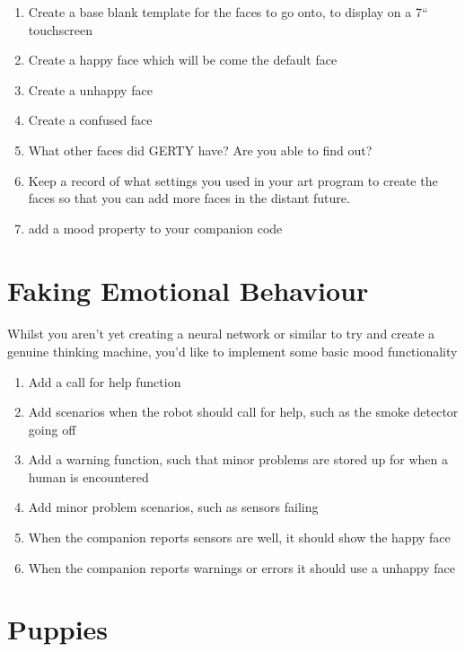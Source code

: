 \documentclass[11pt]{book}
\begin{document}
\begin{enumerate}
\item Create a base blank template for the faces to go onto, to display on a 7`` touchscreen
\item Create a happy face which will be come the default face
\item Create a unhappy face
\item Create a confused face
\item What other faces did GERTY have? Are you able to find out?
\item Keep a record of what settings you used in your art program to create the faces so that you can add more faces in the distant future.
\item add a mood property to your companion code
\end{enumerate}

\clearpage

\section{Faking Emotional Behaviour}

\paragraph{} Whilst you aren't yet creating a neural network or similar to try and create a genuine thinking machine, you'd like to implement some basic mood functionality

\begin{enumerate}
\item Add a call for help function
\item Add scenarios when the robot should call for help, such as the smoke detector going off
\item Add a warning function, such that minor problems are stored up for when a human is encountered
\item Add minor problem scenarios, such as sensors failing
\item When the companion reports sensors are well, it should show the happy face
\item When the companion reports warnings or errors it should use a unhappy face
\end{enumerate}

\clearpage


\section{Puppies}
\end{document}
